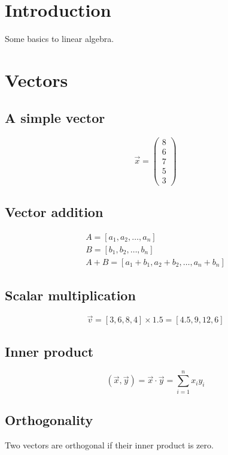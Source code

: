\documentclass[a4paper, 12pt]{article}
\begin{document}
\section{Introduction}

Some basics to linear algebra.

\section{Vectors}

\subsection{A simple vector}

\[
\vec{x} = \begin{pmatrix}8\\6\\7\\5\\3\end{pmatrix}
\]

\subsection{Vector addition}

\begin{gather}
A = [a_{1}, a_{2}, \dotsc, a_{n}] \\
B = [b_{1}, b_{2}, \dotsc, b_{n}] \\
A + B = [a_{1} + b_{1}, a_{2} + b_{2}, \dotsc, a_{n} + b_{n}]
\end{gather}

\subsection{Scalar multiplication}

\[
\vec{v} = [3, 6, 8, 4] \times 1.5 = [4.5, 9, 12, 6]
\]

\subsection{Inner product}

\[
(\vec{x}, \vec{y}) = \vec{x} \cdot \vec{y} = \sum_{i=1}^{n}{x_{i}y_{i}}
\]

\subsection{Orthogonality}

Two vectors are orthogonal if their inner product is zero.
\end{document}
